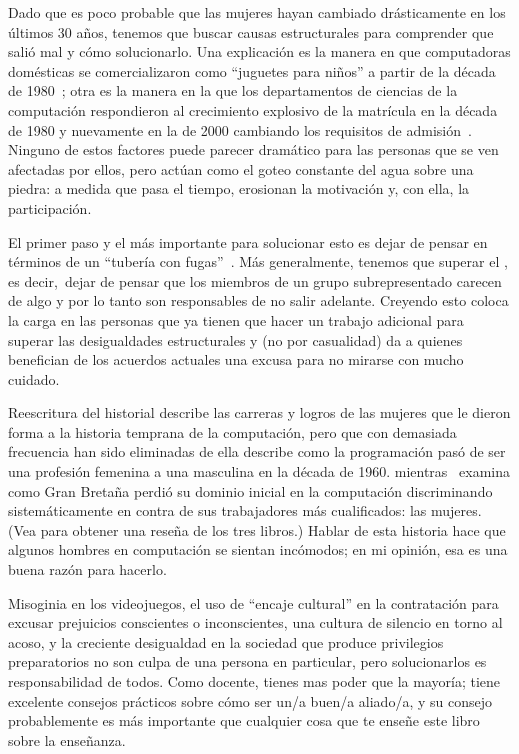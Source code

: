 
Dado que es poco probable que las mujeres hayan cambiado drásticamente en los últimos 30 años,
tenemos que buscar causas estructurales para comprender que salió mal y cómo solucionarlo.
Una explicación es la manera en que computadoras domésticas se comercializaron como ``juguetes para niños'' a partir de la década de 1980~\cite{Marg2003};
otra es la manera en la que los departamentos de ciencias de la computación respondieron al crecimiento explosivo de la matrícula
en la década de 1980 y nuevamente en la de 2000
cambiando los requisitos de admisión~\cite{Robe2017}.
Ninguno de estos factores puede parecer dramático para las personas que se ven afectadas por ellos,
pero actúan como el goteo constante del agua sobre una piedra:
a medida que pasa el tiempo, erosionan la motivación y, con ella, la participación.

El primer paso y el más importante para solucionar esto es
dejar de pensar en términos de un ``tubería con fugas''~\cite{Mill2015}.
Más generalmente,
tenemos que superar el ,
es decir,\ dejar de pensar que los miembros de un grupo subrepresentado carecen de algo
y por lo tanto son responsables de no salir adelante.
Creyendo esto coloca la carga en las personas que ya tienen que hacer un trabajo adicional para superar las desigualdades estructurales
y (no por casualidad) da a quienes benefician de los acuerdos actuales
una excusa para no mirarse con mucho cuidado.

\begin{aside}{Reescritura del historial}
  \cite{Abba2012} describe las carreras y logros de
  las mujeres que le dieron forma a la historia temprana de la computación,
  pero que con demasiada frecuencia han sido eliminadas de ella
  \cite{Ensm2003,Ensm2012} describe como la programación pasó de ser una profesión femenina a una masculina en la década de 1960.
  mientras~\cite{Hick2018} examina como Gran Bretaña perdió su dominio inicial en la computación
  discriminando sistemáticamente en contra de sus trabajadores más cualificados:
  las mujeres.
  (Vea \cite{Milt2018} para obtener una reseña de los tres libros.)
  Hablar de esta historia hace que algunos hombres en computación se sientan incómodos;
  en mi opinión,
  esa es una buena razón para hacerlo.
\end{aside}

Misoginia en los videojuegos,
el uso de ``encaje cultural'' en la contratación para excusar prejuicios conscientes o inconscientes,
una cultura de silencio en torno al acoso,
y la creciente desigualdad en la sociedad que produce privilegios preparatorios
no son culpa de una persona en particular,
pero solucionarlos es responsabilidad de todos.
Como docente,
tienes mas poder que la mayoría;
tiene excelente consejos prácticos sobre cómo ser un/a buen/a aliado/a,
y su consejo probablemente es más importante que cualquier cosa que te enseñe este libro sobre la enseñanza.


